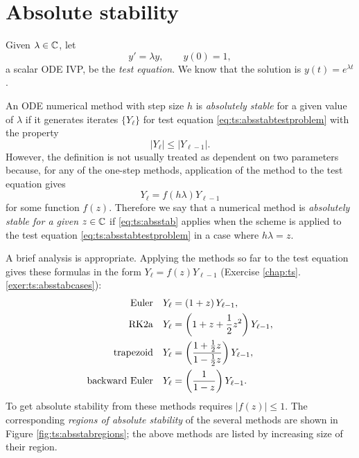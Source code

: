 \section{Absolute stability}

Given $\lambda \in \mathbb{C}$, let
\begin{equation}
y' = \lambda y, \qquad y(0)=1, \label{eq:ts:absstabtestproblem}
\end{equation}
a scalar ODE IVP, be the \emph{test equation}.  We know that the solution is $y(t) = e^{\lambda t}$.

An ODE numerical method with step size $h$ is \emph{absolutely stable} for a given value of $\lambda$ if it generates iterates $\{Y_\ell\}$ for test equation \eqref{eq:ts:absstabtestproblem} with the property
\begin{equation}
|Y_\ell| \le |Y_{\ell-1}|. \label{eq:ts:absstab}
\end{equation}
However, the definition is not usually treated as dependent on two parameters because, for any of the one-step methods, application of the method to the test equation gives
    $$Y_\ell = f(h\lambda) Y_{\ell-1}$$
for some function $f(z)$.  Therefore we say that a numerical method is \emph{absolutely stable for a given} $z\in\mathbb{C}$ if \eqref{eq:ts:absstab} applies when the scheme is applied to the test equation \eqref{eq:ts:absstabtestproblem} in a case where $h\lambda=z$.

A brief analysis is appropriate.  Applying the methods so far to the test equation gives these formulas in the form $Y_\ell = f(z) Y_{\ell-1}$ (Exercise \ref{chap:ts}.\ref{exer:ts:absstabcases}):
\begin{align}
\text{Euler}              && Y_\ell &= \left(1+z\right) Y_{\ell-1}, \label{eq:ts:absstabcases} \\
\text{RK$2$a}            && Y_\ell &= \left(1+z + \frac{1}{2} z^2\right) Y_{\ell-1}, \notag \\
\text{trapezoid}          && Y_\ell &= \left(\frac{1+\frac{1}{2} z}{1-\frac{1}{2}z}\right) Y_{\ell-1}, \notag \\
\text{backward Euler}     && Y_\ell &= \left(\frac{1}{1-z}\right) Y_{\ell-1}. \notag
\end{align}
To get absolute stability from these methods requires $|f(z)|\le 1$.  The corresponding \emph{regions of absolute stability} of the several methods are shown in Figure \ref{fig:ts:absstabregions}; the above methods are listed by increasing size of their region.

